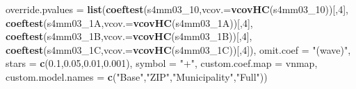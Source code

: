 \documentclass[
]{article}
\newenvironment{Shaded}{\begin{snugshade}}{\end{snugshade}}
\newcommand{\DataTypeTok}[1]{\textcolor[rgb]{0.13,0.29,0.53}{#1}}
\newcommand{\DecValTok}[1]{\textcolor[rgb]{0.00,0.00,0.81}{#1}}
\newcommand{\FloatTok}[1]{\textcolor[rgb]{0.00,0.00,0.81}{#1}}
\newcommand{\KeywordTok}[1]{\textcolor[rgb]{0.13,0.29,0.53}{\textbf{#1}}}
\newcommand{\NormalTok}[1]{#1}
\newcommand{\StringTok}[1]{\textcolor[rgb]{0.31,0.60,0.02}{#1}}
\begin{document}
\begin{Shaded}
\begin{Highlighting}[]
          \DataTypeTok{override.pvalues =} \KeywordTok{list}\NormalTok{(}\KeywordTok{coeftest}\NormalTok{(s4mm03_}\DecValTok{10}\NormalTok{,}\DataTypeTok{vcov.=}\KeywordTok{vcovHC}\NormalTok{(s4mm03_}\DecValTok{10}\NormalTok{))[,}\DecValTok{4}\NormalTok{],}
                                  \KeywordTok{coeftest}\NormalTok{(s4mm03_1A,}\DataTypeTok{vcov.=}\KeywordTok{vcovHC}\NormalTok{(s4mm03_1A))[,}\DecValTok{4}\NormalTok{],}
                                  \KeywordTok{coeftest}\NormalTok{(s4mm03_1B,}\DataTypeTok{vcov.=}\KeywordTok{vcovHC}\NormalTok{(s4mm03_1B))[,}\DecValTok{4}\NormalTok{],}
                                  \KeywordTok{coeftest}\NormalTok{(s4mm03_1C,}\DataTypeTok{vcov.=}\KeywordTok{vcovHC}\NormalTok{(s4mm03_1C))[,}\DecValTok{4}\NormalTok{]),}
          \DataTypeTok{omit.coef =} \StringTok{"(wave)"}\NormalTok{, }\DataTypeTok{stars =} \KeywordTok{c}\NormalTok{(}\FloatTok{0.1}\NormalTok{,}\FloatTok{0.05}\NormalTok{,}\FloatTok{0.01}\NormalTok{,}\FloatTok{0.001}\NormalTok{), }\DataTypeTok{symbol =} \StringTok{"+"}\NormalTok{,}
          \DataTypeTok{custom.coef.map =}\NormalTok{ vnmap, }
          \DataTypeTok{custom.model.names =} \KeywordTok{c}\NormalTok{(}\StringTok{"Base"}\NormalTok{,}\StringTok{"ZIP"}\NormalTok{,}\StringTok{"Municipality"}\NormalTok{,}\StringTok{"Full"}\NormalTok{))}
\end{Highlighting}
\end{Shaded}
\end{document}
